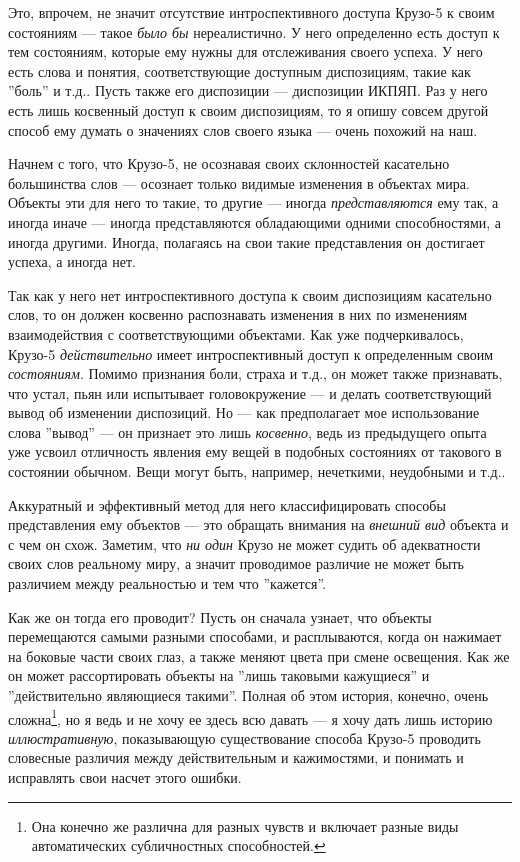 \documentclass[11pt]{book}
\begin{document}
Это, впрочем, не значит отсутствие интроспективного доступа Крузо-5 к своим состояниям --- такое \textit{было бы} нереалистично. У него определенно есть доступ к тем состояниям, которые ему нужны для отслеживания своего успеха. У него есть слова и понятия, соответствующие доступным диспозициям, такие как ''боль'' и т.д.. Пусть также его диспозиции --- диспозиции ИКПЯП. Раз у него есть лишь косвенный доступ к своим диспозициям, то я опишу совсем другой способ ему думать о значениях слов своего языка --- очень похожий на наш.

Начнем с того, что Крузо-5, не осознавая своих склонностей касательно большинства слов --- осознает только видимые изменения в объектах мира. Объекты эти для него то такие, то другие --- иногда \textit{представляются} ему так, а иногда иначе --- иногда представляются обладающими одними способностями, а иногда другими. Иногда, полагаясь на свои такие представления он достигает успеха, а иногда нет.

Так как у него нет интроспективного доступа к своим диспозициям касательно слов, то он должен косвенно распознавать изменения в них по изменениям взаимодействия с соответствующими объектами. Как уже подчеркивалось, Крузо-5 \textit{действительно} имеет интроспективный доступ к определенным своим \textit{состояниям}. Помимо признания боли, страха и т.д., он может также признавать, что устал, пьян или испытывает головокружение --- и делать соответствующий вывод об изменении диспозиций. Но --- как предполагает мое использование слова ''вывод'' --- он признает это лишь \textit{косвенно}, ведь из предыдущего опыта уже усвоил отличность явления ему вещей в подобных состояниях от такового в состоянии обычном. Вещи могут быть, например, нечеткими, неудобными и т.д..

Аккуратный и эффективный метод для него классифицировать способы представления ему объектов --- это обращать внимания на \textit{внешний вид} объекта и с чем он схож. Заметим, что \textit{ни один} Крузо не может судить об адекватности своих слов реальному миру, а значит проводимое различие не может быть различием между реальностью и тем что ''кажется''.

Как же он тогда его проводит? Пусть он сначала узнает, что объекты перемещаются самыми разными способами, и расплываются, когда он нажимает на боковые части своих глаз, а также меняют цвета при смене освещения. Как же он может рассортировать объекты на ''лишь таковыми кажущиеся'' и ''действительно являющиеся такими''. Полная об этом история, конечно, очень сложна\footnote{Она конечно же различна для разных чувств и включает разные виды автоматических субличностных способностей.}, но я ведь и не хочу ее здесь всю давать --- я хочу дать лишь историю \textit{иллюстративную}, показывающую существование способа Крузо-5 проводить словесные различия между действительным и кажимостями, и понимать и исправлять свои насчет этого ошибки.
\end{document}
